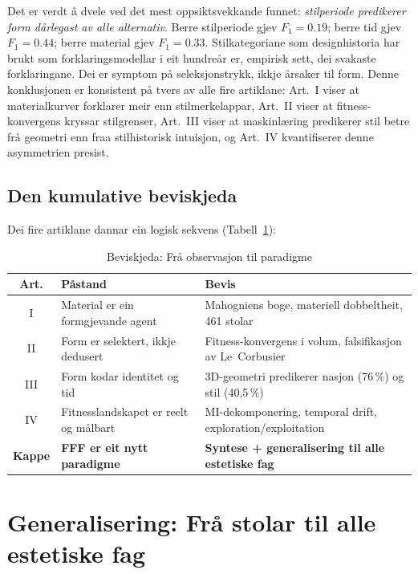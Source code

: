 \documentclass[12pt,a4paper]{article}
\begin{document}
Det er verdt \aa{} dvele ved det mest oppsiktsvekkande funnet: \emph{stilperiode predikerer form d\aa{}rlegast av alle alternativ}. Berre stilperiode gjev $F_1 = 0.19$; berre tid gjev $F_1 = 0.44$; berre material gjev $F_1 = 0.33$. Stilkategoriane som designhistoria har brukt som forklaringsmodellar i eit hundre\aa{}r er, empirisk sett, dei svakaste forklaringane. Dei er symptom p\aa{} seleksjonstrykk, ikkje \aa{}rsaker til form. Denne konklusjonen er konsistent p\aa{} tvers av alle fire artiklane: Art.~I viser at materialkurver forklarer meir enn stilmerkelappar, Art.~II viser at fitness-konvergens kryssar stilgrenser, Art.~III viser at maskinl\ae{}ring predikerer stil betre fr\aa{} geometri enn fraa stilhistorisk intuisjon, og Art.~IV kvantifiserer denne asymmetrien presist.

\subsection{Den kumulative beviskjeda}

Dei fire artiklane dannar ein logisk sekvens (Tabell~\ref{tab:beviskjede}):

\begin{table}[H]
\centering
\caption{Beviskjeda: Fr\aa{} observasjon til paradigme}
\label{tab:beviskjede}
\small
\begin{tabularx}{\textwidth}{clX}
\toprule
\textbf{Art.} & \textbf{P\aa{}stand} & \textbf{Bevis} \\
\midrule
I & Material er ein formgjevande agent & Mahogniens boge, materiell dobbeltheit, 461 stolar \\
II & Form er selektert, ikkje dedusert & Fitness-konvergens i volum, falsifikasjon av Le~Corbusier \\
III & Form kodar identitet og tid & 3D-geometri predikerer nasjon (76\,\%) og stil (40{,}5\,\%) \\
IV & Fitnesslandskapet er reelt og m\aa{}lbart & MI-dekomponering, temporal drift, exploration/exploitation \\
\midrule
\textbf{Kappe} & \textbf{FFF er eit nytt paradigme} & \textbf{Syntese + generalisering til alle estetiske fag} \\
\bottomrule
\end{tabularx}
\end{table}

\section{Generalisering: Fr\aa{} stolar til alle estetiske fag}
\label{sec:generalisering}
\end{document}
